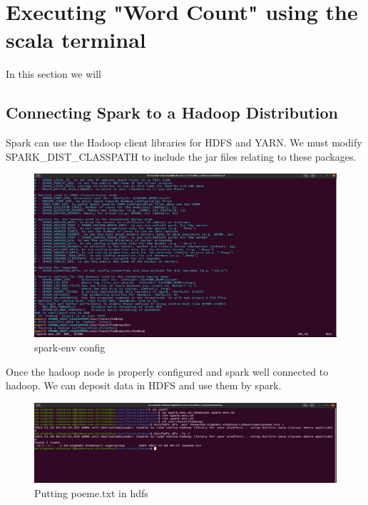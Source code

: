 \chapter{Executing "Word Count" using the scala terminal}
\par In this section we will 
\begin{spacing}{1.2}
\section{Connecting Spark to a Hadoop Distribution}

\par Spark can use the Hadoop client libraries for HDFS and YARN. We must modify SPARK_DIST_CLASSPATH to include the jar files relating to these packages.
\\
\begin{figure}[!htb] 
\begin{center} 
\includegraphics[width=1\linewidth]{Big_Data/Spark/Connecting Spark to Hadoop/spark-env config} 
\end{center} 
\caption{spark-env config} 
\end{figure} 
\FloatBarrier



\par Once the hadoop node is properly configured and spark well connected to hadoop. We can deposit data
in HDFS and use them by spark.
\\
\begin{figure}[!htb] 
\begin{center} 
\includegraphics[width=1\linewidth]{Big_Data/Spark/Executing WCount using scala/Putting poeme.txt in hdfs} 
\end{center} 
\caption{Putting poeme.txt in hdfs} 
\end{figure} 
\FloatBarrier


\end{spacing}
